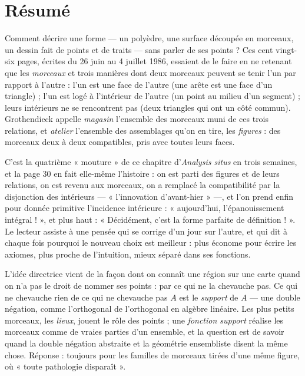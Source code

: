 \documentclass[11pt,a4paper]{article}
\begin{document}
\section*{Résumé}

\begin{resume}
Comment décrire une forme --- un polyèdre, une surface découpée en morceaux,
un dessin fait de points et de traits --- sans parler de ses points ? Ces cent
vingt-six pages, écrites du 26 juin au 4 juillet 1986, essaient de le faire en ne
retenant que les \emph{morceaux} et trois manières dont deux morceaux peuvent
se tenir l'un par rapport à l'autre : l'un est une face de l'autre (une arête
est une face d'un triangle) ; l'un est logé à l'intérieur de l'autre (un point
au milieu d'un segment) ; leurs intérieurs ne se rencontrent pas (deux
triangles qui ont un côté commun). Grothendieck appelle \emph{magasin}
l'ensemble des morceaux muni de ces trois relations, et \emph{atelier}
l'ensemble des assemblages qu'on en tire, les \emph{figures} : des morceaux
deux à deux compatibles, pris avec toutes leurs faces.

C'est la quatrième « mouture » de ce chapitre d'\emph{Analysis situs} en trois
semaines, et la page 30 en fait elle-même l'histoire : on est parti des
figures et de leurs relations, on est revenu aux morceaux, on a remplacé la
compatibilité par la disjonction des intérieurs --- « l'innovation
d'avant-hier » ---, et l'on prend enfin pour donnée primitive l'incidence
intérieure : « aujourd'hui, l'épanouissement intégral ! », et plus haut :
« Décidément, c'est la forme parfaite de définition ! ». Le lecteur assiste à
une pensée qui se corrige d'un jour sur l'autre, et qui dit à chaque fois
pourquoi le nouveau choix est meilleur : plus économe pour écrire les axiomes,
plus proche de l'intuition, mieux séparé dans ses fonctions.

L'idée directrice vient de la façon dont on connaît une région sur une carte
quand on n'a pas le droit de nommer ses points : par ce qui ne la chevauche
pas. Ce qui ne chevauche rien de ce qui ne chevauche pas $A$ est le
\emph{support} de $A$ --- une double négation, comme l'orthogonal de
l'orthogonal en algèbre linéaire. Les plus petits morceaux, les \emph{lieux},
jouent le rôle des points ; une \emph{fonction support} réalise les morceaux
comme de vraies parties d'un ensemble, et la question est de savoir quand la
double négation abstraite et la géométrie ensembliste disent la même chose.
Réponse : toujours pour les familles de morceaux tirées d'une même figure,
où « toute pathologie disparaît ».


\end{resume}
\end{document}
